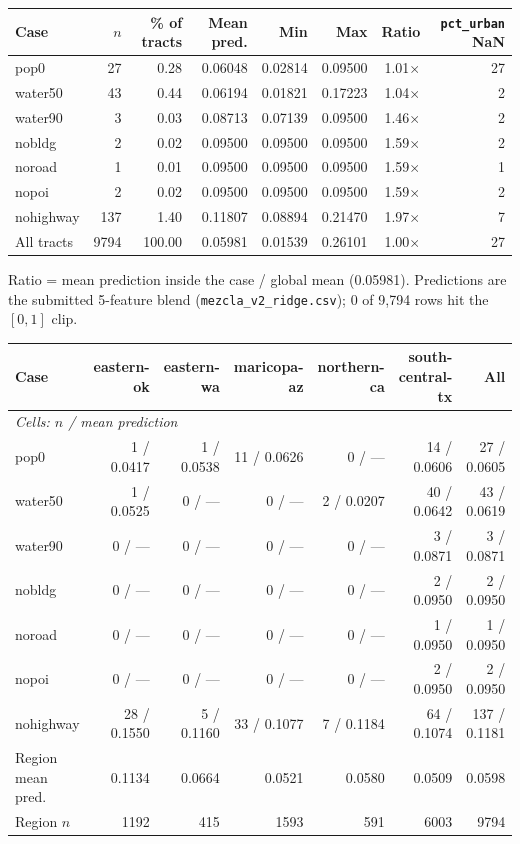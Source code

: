 \begin{tabular}{lrrrrrrr}
\toprule
Case & $n$ & \% of tracts & Mean pred. & Min & Max & Ratio & \texttt{pct\_urban} NaN \\
\midrule
pop0 & 27 & 0.28 & 0.06048 & 0.02814 & 0.09500 & 1.01$\times$ & 27 \\
water50 & 43 & 0.44 & 0.06194 & 0.01821 & 0.17223 & 1.04$\times$ & 2 \\
water90 & 3 & 0.03 & 0.08713 & 0.07139 & 0.09500 & 1.46$\times$ & 2 \\
nobldg & 2 & 0.02 & 0.09500 & 0.09500 & 0.09500 & 1.59$\times$ & 2 \\
noroad & 1 & 0.01 & 0.09500 & 0.09500 & 0.09500 & 1.59$\times$ & 1 \\
nopoi & 2 & 0.02 & 0.09500 & 0.09500 & 0.09500 & 1.59$\times$ & 2 \\
nohighway & 137 & 1.40 & 0.11807 & 0.08894 & 0.21470 & 1.97$\times$ & 7 \\
\midrule
All tracts & 9794 & 100.00 & 0.05981 & 0.01539 & 0.26101 & 1.00$\times$ & 27 \\
\bottomrule
\end{tabular}

\par\smallskip\footnotesize
Ratio = mean prediction inside the case / global mean (0.05981). Predictions are the submitted 5-feature blend (\texttt{mezcla\_v2\_ridge.csv}); 0 of 9{,}794 rows hit the $[0,1]$ clip.
\begin{tabular}{lrrrrrr}
\toprule
Case & eastern-ok & eastern-wa & maricopa-az & northern-ca & south-central-tx & All \\
\midrule
\multicolumn{7}{l}{\emph{Cells: $n$ / mean prediction}} \\
\midrule
pop0 & 1 / 0.0417 & 1 / 0.0538 & 11 / 0.0626 & 0 / --- & 14 / 0.0606 & 27 / 0.0605 \\
water50 & 1 / 0.0525 & 0 / --- & 0 / --- & 2 / 0.0207 & 40 / 0.0642 & 43 / 0.0619 \\
water90 & 0 / --- & 0 / --- & 0 / --- & 0 / --- & 3 / 0.0871 & 3 / 0.0871 \\
nobldg & 0 / --- & 0 / --- & 0 / --- & 0 / --- & 2 / 0.0950 & 2 / 0.0950 \\
noroad & 0 / --- & 0 / --- & 0 / --- & 0 / --- & 1 / 0.0950 & 1 / 0.0950 \\
nopoi & 0 / --- & 0 / --- & 0 / --- & 0 / --- & 2 / 0.0950 & 2 / 0.0950 \\
nohighway & 28 / 0.1550 & 5 / 0.1160 & 33 / 0.1077 & 7 / 0.1184 & 64 / 0.1074 & 137 / 0.1181 \\
\midrule
Region mean pred. & 0.1134 & 0.0664 & 0.0521 & 0.0580 & 0.0509 & 0.0598 \\
Region $n$ & 1192 & 415 & 1593 & 591 & 6003 & 9794 \\
\bottomrule
\end{tabular}

